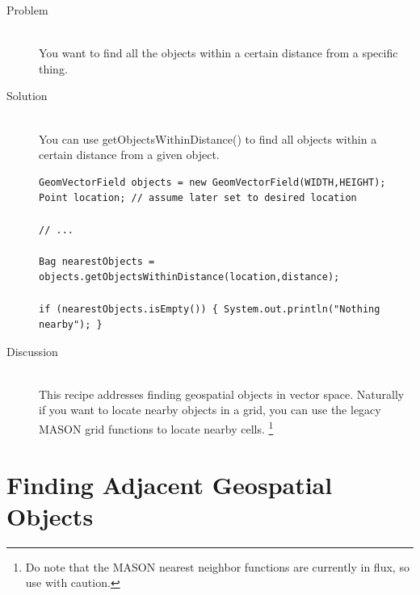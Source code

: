 \documentclass[twoside,10pt]{book}
\newcommand\method[1]{\textsf{#1}}
\begin{document}
\begin{description}
\item[Problem]~\\
You want to find all the objects within a certain distance from a
specific thing.

\item[Solution]~\\
You can use \method{getObjectsWithinDistance()} to find all
objects within a certain distance from a given object.
\begin{Verbatim}[frame=lines,framesep=5mm,commandchars=+\[\]]
GeomVectorField objects = new GeomVectorField(WIDTH,HEIGHT);
Point location; // assume later set to desired location

// ...
	
Bag nearestObjects = objects.getObjectsWithinDistance(location,distance);

if (nearestObjects.isEmpty()) { System.out.println("Nothing nearby"); }
\end{Verbatim}

\item[Discussion]~\\
This recipe addresses finding geospatial objects in vector space.
Naturally if you want to locate nearby objects in a grid, you can use
the legacy MASON grid functions to locate nearby cells. \footnote{Do
  note that the MASON nearest neighbor functions are currently in
  flux, so use with caution.}
\end{description}


\section{Finding Adjacent Geospatial Objects}
\label{sec:findingadjacent}
\end{document}
